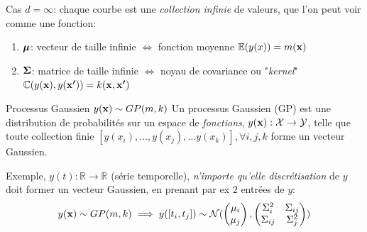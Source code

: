 \documentclass[xcolor=svgnames, t]{beamer}
\newcommand{\vectorx}[1]{\boldsymbol{\MakeLowercase{\mathbf{#1}}}}
\newcommand{\matrixx}[1]{\boldsymbol{\MakeUppercase{#1}}}
\newcommand{\coloredemph}[1]{\textcolor{internationalblue}{\emph{#1}}}
\begin{document}
%

\begin{frame}{\subsecname}
  
  Cas $d=\infty$: chaque courbe est une \coloredemph{collection infinie} de valeurs, que l'on peut voir comme une fonction:
  \begin{enumerate}
    \item $\vectorx{\mu}$: vecteur de taille infinie $\Leftrightarrow$ fonction moyenne $\mathbb{E}(y(x)) = m(\vectorx{x})$
    \item $\matrixx{\Sigma}$: matrice de taille infinie $\Leftrightarrow$  noyau de covariance ou "\coloredemph{kernel}"
    $\mathbb{C}( y(\vectorx{x}), y(\vectorx{x^\prime}) ) = k(\vectorx{x}, \vectorx{x^{\prime}})$
  \end{enumerate}
  \pause
  \begin{block}{Processus Gaussien $y(\vectorx{x}) \sim GP(m, k)$}
    Un processus Gaussien (GP) est une distribution de probabilités sur un espace de \coloredemph{fonctions},
    $y(\vectorx{x}): \mathcal{X} \to \mathcal{Y}$, telle que toute collection finie
    $[ y(x_i), \dots, y(x_j), \dots y(x_k) ], \forall i,j,k$ forme un vecteur Gaussien. 
  \end{block}
  \pause
  Exemple, $y(t): \mathbb{R} \to \mathbb{R}$ (série temporelle), \coloredemph{n'importe qu'elle discrétisation} de $y$ doit
   former un vecteur Gaussien, en prenant par ex $2$ entrées de $y$:
  \begin{equation*}
    y(\vectorx{x}) \sim GP(m, k) \implies
    y([t_i, t_j]) \sim \mathcal{N} (
      \begin{pmatrix}
        \mu_i \\
        \mu_j 
      \end{pmatrix},
      \begin{pmatrix}
        \Sigma_{i}^2 & \Sigma_{ij} \\
        \Sigma_{ij} & \Sigma_{j}^2
      \end{pmatrix}
      )
  \end{equation*}
\end{frame}
\end{document}
